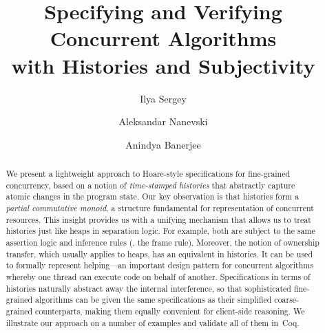 \documentclass[runningheads]{llncs}
\newcommand{\mytitle}{Specifying and Verifying Concurrent
  Algorithms \\
with Histories and Subjectivity}
\begin{document}
 

\setlength{\pdfpageheight}{\paperheight}
\setlength{\pdfpagewidth}{\paperwidth}


%

\author{Ilya Sergey \and 
  Aleksandar Nanevski \and
  Anindya Banerjee}


\title{\mytitle}

\maketitle 

\begin{abstract}

  We present a lightweight approach to Hoare-style specifications for
  fine-grained concurrency, based on a notion of \emph{time-stamped
    histories} that abstractly capture atomic changes in the program
  state.
% 
Our key observation is that histories form a \emph{partial commutative
  monoid}, a structure fundamental for representation of concurrent
resources.
%
This insight provides us with a unifying mechanism that allows us to
treat histories just like heaps in separation logic. For example, both
are subject to the same assertion logic and inference rules (\eg, the
frame rule). Moreover, the notion of ownership transfer, which usually
applies to heaps, has an equivalent in histories. It can be used to
formally represent helping---an important design pattern for
concurrent algorithms whereby one thread can execute code on behalf of
another.
%
Specifications in terms of histories naturally abstract away the
internal interference, so that sophisticated fine-grained algorithms
can be given the same specifications as their simplified
coarse-grained counterparts, making them equally convenient for
client-side reasoning.
% 
We illustrate our approach on a number of examples and validate all of
them in~Coq.
  
\end{abstract}











 




% 
\end{document}
